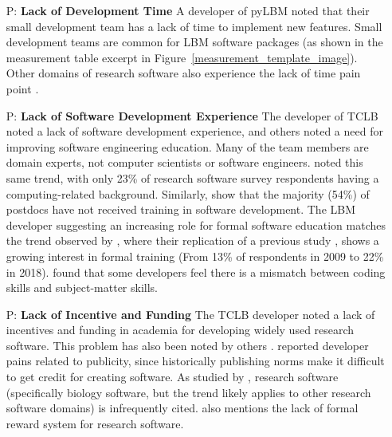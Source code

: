 \documentclass[final, 3p, times, authoryear]{elsarticle}
\newcounter{pnum} %
\begin{document}
\begin{enumerate}

	\item[P\refstepcounter{pnum}\thepnum \label{P_LackDevTime}:] \textbf{Lack of
	Development Time} A developer of pyLBM noted that their small development
	team has a lack of time to implement new features. Small development teams
	are common for LBM software packages (as shown in the measurement table
	excerpt in Figure~\ref{measurement_template_image}). Other domains of
	research software also experience the lack of time pain point
	\citep{PintoEtAl2018, PintoEtAl2016, WieseEtAl2019}.

	\item[P\refstepcounter{pnum}\thepnum \label{P_LackSoftDevExp}:] \textbf{Lack
	of Software Development Experience} The developer of TCLB noted a lack of
	software development experience, and others noted a need for improving
	software engineering education. Many of the team members are domain experts,
	not computer scientists or software engineers. \citet{Nguyen-HoanEtAl2010}
	noted this same trend, with only 23\% of research software survey
	respondents having a computing-related background. Similarly,
	\citet{UditAndKatz2017} show that the majority (54\%) of postdocs have not
	received training in software development.  The LBM developer suggesting an
	increasing role for formal software education matches the trend observed by
	\citet{PintoEtAl2018}, where their replication of a previous study
	\citep{HannayEtAl2009}, shows a growing interest in formal training (From
	13\% of respondents in 2009 to 22\% in 2018). \citet{PintoEtAl2018} found
	that some developers feel there is a mismatch between coding skills and
	subject-matter skills. 
	
	\item[P\refstepcounter{pnum}\thepnum \label{P_LackFunding}:] \textbf{Lack of
	Incentive and Funding} The TCLB developer noted a lack of incentives and
	funding in academia for developing widely used research software. This
	problem has also been noted by others \citep{gewaltig2012quality, Goble2014,
	KaterbowAndFeulner2018}.  \citet{WieseEtAl2019} reported developer pains
	related to publicity, since historically publishing norms make it difficult
	to get credit for creating software.  As studied by
	\citet{HowisonAndBullard2016}, research software (specifically biology
	software, but the trend likely applies to other research software domains)
	is infrequently cited.  \citet{PintoEtAl2018} also mentions the lack of
	formal reward system for research software.


\end{enumerate}
\end{document}
